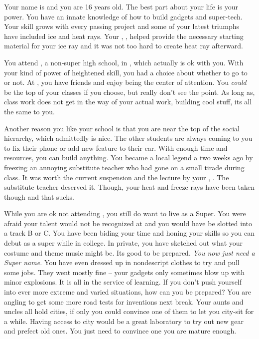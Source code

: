 \documentclass[char]{LRSguildcamp1}
\begin{document}
\name{\cTeen{}}



Your name is \cTeen{\intro} and you are 16 years old. The best part about your life is your power. You have an innate knowledge of how to build gadgets and super-tech. Your skill grows with every passing project and some of your latest triumphs have included ice and heat rays. Your \cOldest{\uncle}, \cOldest{}, helped provide the necessary starting material for your ice ray and it was not too hard to create heat ray afterward. 

You attend \pNormalSchool{}, a non-super high school, in \pCityArchitect{}, which actually is ok with you. With your kind of power of heightened skill, you had a choice about whether to go to \pSuperSchool{} or not. At \pNormalSchool{}, you have friends and enjoy being the center of attention. You \textsl{could} be the top of your classes if you choose, but really don't see the point. As long as,  class work does not get in the way of your actual work, building cool stuff, its all the same to you. 

Another reason you like your school is that you are near the top of the social hierarchy, which admittedly is nice. The other students are always coming to you to fix their phone or add new feature to their car. With enough time and resources, you can build anything. You became a local legend a two weeks ago by freezing an annoying substitute teacher who had gone on a small tirade during class. It was worth the current suspension and the lecture by your \cArchitect{\parent}, \cArchitect{}. The substitute teacher deserved it. Though, your heat and freeze rays have been taken though and that sucks. 

While you are ok not attending \pSuperSchool{}, you still do want to live as a Super. You were afraid your talent would not be recognized at \pSuperSchool{} and you would have be slotted into a track B or C. You have been biding your time and honing your skills so you can debut as a super while in college. In private, you have sketched out what your costume and theme music might be. Its good to be prepared. \textit{You now just need a Super name.} You have even dressed up in nondescript clothes to try and pull some jobs. They went mostly fine -- your gadgets only sometimes blow up with minor explosions. It is all in the service of learning. If you don't push yourself into ever more extreme and varied situations, how can you be prepared? You are angling to get some more road tests for inventions next break. Your aunts and uncles all hold cities, if only you could convince one of them to let you city-sit for a while. Having access to city would be a great laboratory to try out new gear and prefect old ones. You just need to convince one you are mature enough.
\end{document}
